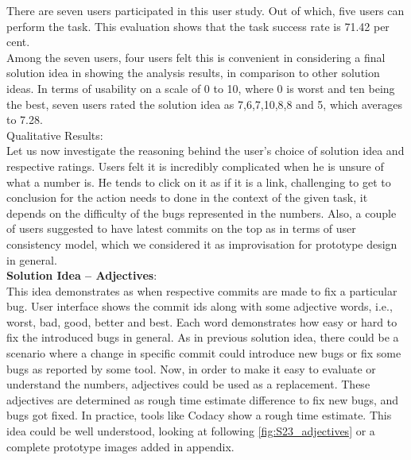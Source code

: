 There are seven users participated in this user study. Out of which, five users can perform the task. This evaluation shows that the task success rate is 71.42 per cent. \\

Among the seven users, four users felt this is convenient in considering a final solution idea in showing the analysis results, in comparison to other solution ideas. In terms of usability on a scale of 0 to 10, where 0 is worst and ten being the best, seven users rated the solution idea as 7,6,7,10,8,8 and 5, which averages to 7.28. \\

Qualitative Results: \\

Let us now investigate the reasoning behind the user’s choice of solution idea and respective ratings. Users felt it is incredibly complicated when he is unsure of what a number is. He tends to click on it as if it is a link, challenging to get to conclusion for the action needs to done in the context of the given task, it depends on the difficulty of the bugs represented in the numbers. Also, a couple of users suggested to have latest commits on the top as in terms of user consistency model, which we considered it as improvisation for prototype design in general. \\

\textbf{Solution Idea – Adjectives}: \\

This idea demonstrates as when respective commits are made to fix a particular bug. User interface shows the commit ids along with some adjective words, i.e., worst, bad, good, better and best. Each word demonstrates how easy or hard to fix the introduced bugs in general. As in previous solution idea, there could be a scenario where a change in specific commit could introduce new bugs or fix some bugs as reported by some tool. Now, in order to make it easy to evaluate or understand the numbers, adjectives could be used as a replacement. These adjectives are determined as rough time estimate difference to fix new bugs, and bugs got fixed. In practice, tools like Codacy show a rough time estimate. This idea could be well understood, looking at following \autoref{fig:S23_adjectives} or a complete prototype images added in appendix. \\


